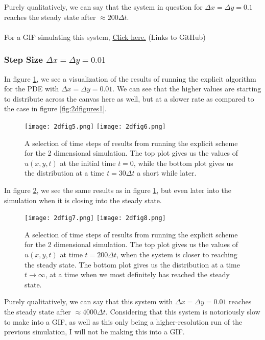 \documentclass[reprint,english,notitlepage]{revtex4-1}  %
\begin{document}
Purely qualitatively, we can say that the system in question for $\Delta x = \Delta y = 0.1$ reaches the steady state after $\approx 200\Delta t$.
\\
\\
For a GIF simulating this system, \href{https://github.com/Jan-Egil/FYS3150/blob/master/Project5/Project5/GIF/expdelxy10.gif}{Click here.} (Links to GitHub)

\newpage

\subsubsection{Step Size $\Delta x = \Delta y = 0.01$}

In figure \ref{fig:2dfigures3}, we see a visualization of the results of running the explicit algorithm for the PDE with $\Delta x = \Delta y = 0.01$. We can see that the higher values are starting to distribute across the canvas here as well, but at a slower rate as compared to the case in figure \ref{fig:2dfigures1}.

\begin{figure}[h!]
    \centering
    \texttt{[image: 2dfig5.png]}
    \texttt{[image: 2dfig6.png]}    
    \caption{A selection of time steps of results from running the explicit scheme for the 2 dimensional simulation. The top plot gives us the values of $u(x,y,t)$ at the initial time $t = 0$, while the bottom plot gives us the distribution at a time $t = 30\Delta t$ a short while later.}
    \label{fig:2dfigures3}
\end{figure}

In figure \ref{fig:2dfigures4}, we see the same results as in figure \ref{fig:2dfigures3}, but even later into the simulation when it is closing into the steady state.

\begin{figure}[h!]
    \centering
    \texttt{[image: 2dfig7.png]}
    \texttt{[image: 2dfig8.png]}    
    \caption{A selection of time steps of results from running the explicit scheme for the 2 dimensional simulation. The top plot gives us the values of $u(x,y,t)$ at time $t = 200\Delta t$, when the system is closer to reaching the steady state. The bottom plot gives us the distribution at a time $t \rightarrow\infty$, at a time when we most definitely has reached the steady state.}
    \label{fig:2dfigures4}
\end{figure}

Purely qualitatively, we can say that this system with $\Delta x = \Delta y = 0.01$ reaches the steady state after $\approx 4000\Delta t$. Considering that this system is notoriously slow to make into a GIF, as well as this only being a higher-resolution run of the previous simulation, I will not be making this into a GIF.
\end{document}
